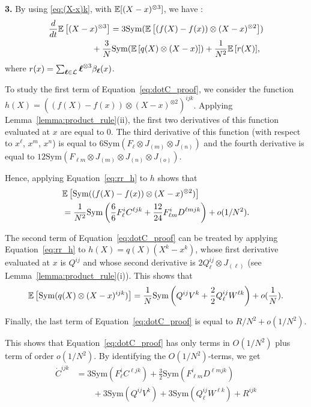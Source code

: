 \documentclass[sigconf]{acmart}
\newcommand\bl{{\text{\boldmath$\ell$}}}
\newcommand\calL{\mathcal{L}}
\newcommand\esp[1]{{\mathchoice{\besp{#1}}{\sesp{#1}}{\sesp{#1}}{\sesp{#1}}}}
\newcommand\besp[1]{\mathbb{E}\left[#1\right]}
\newcommand\sesp[1]{\mathbb{E}[#1]}
\newcommand\p[1]{\left(#1\right)}
\newcommand\dt{\frac{d}{dt}}
\newcommand\Sym{\mathrm{Sym}}
\newcommand\J[1]{J_{(#1)}}
\begin{document}
  \textbf{3.} By using \eqref{eq:(X-x)k}, with
  $\esp{(X-x)^{\otimes3}}$, we have :
  \begin{align}
    \dt &\esp{(X-x)^{\otimes3}}
          =3\Sym(\esp{(f(X)-f(x))\otimes (X-x)^{\otimes2}})\nonumber\\
        &\qquad\qquad+\frac3N\Sym(\esp{q(X)\otimes(X-x)})
          + \frac1{N^2}\esp{r(X)},
          \label{eq:dotC_proof}
  \end{align}
  where $r(x)=\sum_{\bl\in\calL} \bl^{\otimes3}\beta_\bl(x)$.
  
  To study the first term of Equation~\eqref{eq:dotC_proof}, we
  consider the function
  $h(X)=((f(X)-f(x))\otimes(X-x)^{\otimes2})^{ijk}$. Applying
  Lemma~\ref{lemma:product_rule}(ii), the first two derivatives of
  this function evaluated at $x$ are equal to $0$. The third
  derivative of this function (with respect to $x^\ell$, $x^m$, $x^n$)
  is equal to $6 \Sym(F_{\ell}\otimes \J{m}\otimes \J{n})$ and the
  fourth derivative is equal to
  $12\Sym(F_{\ell m}\otimes \J{m}\otimes \J{n}\otimes \J{o})$.

  Hence, applying Equation~\eqref{eq:rr_h} to $h$ shows that
  \begin{align*}
    &\esp{\Sym((f(X)-f(x))\otimes (X-x)^{\otimes2})}\\
    &= \frac1{N^2}\Sym\p{\frac66F^i_{\ell}C^{\ell jk} + \frac{12}{24}
      F^{i}_{\ell m}D^{\ell mjk}} + o(1/N^2). 
  \end{align*}
  
  The second term of Equation~\eqref{eq:dotC_proof} can be treated by
  applying Equation~\eqref{eq:rr_h} to $h(X)=q(X)(X^k-x^k)$, whose
  first derivative evaluated at $x$ is $Q^{ij}$ and whose second
  derivative is $2Q^{ij}_\ell\otimes \J{\ell}$ (see
  Lemma~\ref{lemma:product_rule}(i)). This shows that
  \begin{align*}
    \esp{\Sym(q(X)\otimes (X-x)^{ijk})}
    =\frac1N\Sym\p{Q^{ij}V^k + \frac22Q^{ij}_\ell W^{\ell k}}+o(\frac1N).%
  \end{align*}
  
  Finally, the last term of Equation~\eqref{eq:dotC_proof} is equal to
  $R/N^2+o(1/N^2)$.

  This shows that Equation~\eqref{eq:dotC_proof} has only terms in
  $O(1/N^2)$ plus term of order $o(1/N^2)$. By identifying the
  $O(1/N^2)$-terms, we get
  \begin{align*}
    \dot{C}^{ijk}
    &= 3\Sym(F^i_{\ell}C^{\ell jk})
      +\frac32\Sym(F^{i}_{\ell m}D^{\ell mjk})
      \\&\qquad+3\Sym(Q^{ij}V^k)
      +3\Sym(Q^{ij}_\ell W^{\ell k})
      +R^{ijk}
  \end{align*}
  
\end{document}
